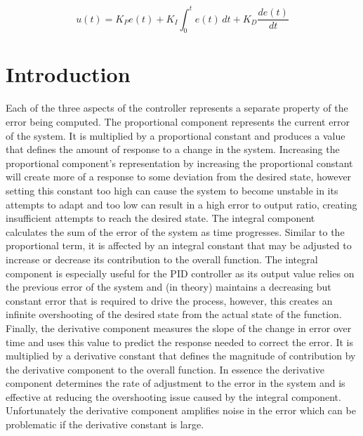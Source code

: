 

\begin{equation}\label{pid-function}
u(t) = K_{P} e(t) + K_{I} \int_0^t e(t)\,dt + K_{D} \frac{d e(t)}{dt}
\end{equation}

\section{Introduction}\label{section_one}
Each of the three aspects of the controller represents a separate property of the error being computed. The proportional component represents the current error of the system. It is multiplied by a proportional constant and produces a value that defines the amount of response to a change in the system. Increasing the proportional component’s representation by increasing the proportional constant will create more of a response to some deviation from the desired state, however setting this constant too high can cause the system to become unstable in its attempts to adapt and too low can result in a high error to output ratio, creating insufficient attempts to reach the desired state. The integral component calculates the sum of the error of the system as time progresses. Similar to the proportional term, it is affected by an integral constant that may be adjusted to increase or decrease its contribution to the overall function. The integral component is especially useful for the PID controller as its output value relies on the previous error of the system and (in theory) maintains a decreasing but constant error that is required to drive the process, however, this creates an infinite overshooting of the desired state from the actual state of the function. Finally, the derivative component measures the slope of the change in error over time and uses this value to predict the response needed to correct the error. It is multiplied by a derivative constant that defines the magnitude of contribution by the derivative component to the overall function. In essence the derivative component determines the rate of adjustment to the error in the system and is effective at reducing the overshooting issue caused by the integral component. Unfortunately the derivative component amplifies noise in the error which can be problematic if the derivative constant is large. 



